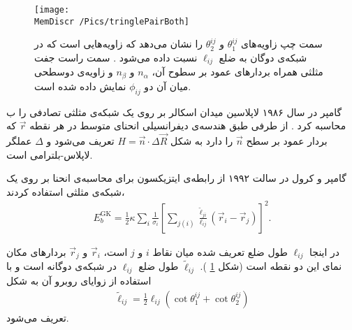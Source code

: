 \begin{figure}[h]
\begin{center}
\texttt{[image: \\MemDiscr /Pics/tringlePairBoth]}
\caption{
سمت چپ زاویه‌های 
$\theta_1^{ij}$
و
$\theta_2^{ij}$
را نشان می‌دهد که زاویه‌هایی است که در شبکه‌ی دوگان به ضلع
$\ell_{ij}$
نسبت داده می‌شود
\cite{Meyer2003}.
 سمت راست جفت مثلثی همراه بردار‌های عمود بر سطوح آن،
$n_\alpha$
و
$n_\beta$
و زاویه‌ی دوسطحی میان آن دو
$\phi_{ij}$
نمایش داده شده ‌است.
}
\label{fig:trianglePairAngle}
\end{center}
\end{figure}

گامپر
در سال ۱۹۸۶ لاپلاسین میدان اسکالر بر روی یک شبکه‌ی مثلثی تصادفی را ب محاسبه کرد
\cite{Itzykson1986}.
از طرفی طبق هندسه‌ی دیفرانسیلی  انحنای متوسط در هر نقطه 
$\vec r$
که بردار عمود بر سطح 
$\vec n$
را دارد به شکل 
$H=\vec n\cdot\Delta \vec R$
تعریف می‌شود 
\cite{gompper1996}
و 
$\Delta$
عملگر لاپلاس-بلترامی
است. 


گامپر و کرول در سالت ۱۹۹۲ از رابطه‌ی ایتزیکسون برای محاسبه‌ی انحنا بر روی یک شبکه‌ی مثلثی استفاده کردند،
\begin{eqnarray}
E_{b}^\text{GK}=\frac{1}{2}\kappa\sum_{i}\frac{1}{\sigma_i}\left[\sum_{j(i)}\frac{\tilde\ell_{ji}}{\ell_{ij}}(\vec r_i-\vec r_j)\right]^2.
\label{eq:ItzyksonPotential}
\end{eqnarray}

در اینجا 
$\ell_{ij}$
طول ضلع تعریف شده میان نقاط 
$i$
و
$j$
است، 
$\vec r_i$
و
$\vec r_j$
بردار‌های مکان نمای این دو نقطه‌ است (شکل
\ref{fig:trianglePairAngle}
). 
$\tilde\ell_{ij}$
طول ضلع 
$\ell_{ij}$
در شبکه‌ی دوگانه‌
است و با استفاده از زوایا‌ی روبرو آن به شکل 
\begin{eqnarray}
\tilde\ell_{ij}=\frac{1}{2}\ell_{ij}(\cot\theta_1^{ij}+\cot\theta_2^{ij})
\label{eq:dualLattice}
\end{eqnarray}
تعریف می‌شود.

